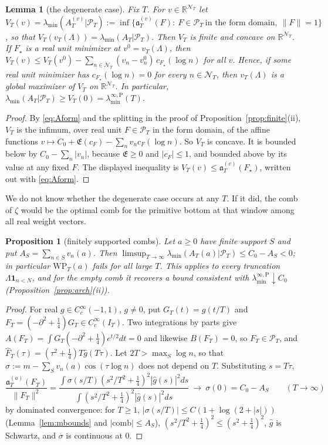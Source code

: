 \documentclass[11pt]{amsart}
\newtheorem{proposition}[theorem]{Proposition}
\newtheorem{lemma}[theorem]{Lemma}
\theoremstyle{definition}
\theoremstyle{remark}
\newcommand{\R}{\mathbb R}
\newcommand{\PT}{\mathcal P_T}
\newcommand{\IT}{I_T}
\newcommand{\lamA}{\lambda_{\min}(A_T|\PT)}
\newcommand{\Fh}{\widehat F}
\newcommand{\cF}{c_F}
\newcommand{\Lev}{\mathfrak E}
\newcommand{\NT}{\mathcal N_T}
\newcommand{\laminfP}{\lambda^{\infty,\mathrm P}_{\min}}
\begin{document}
\begin{lemma}[the degenerate case]\label{lem:degen}
Fix $T$. For $v\in\R^{\NT}$ let
$V_T(v)=\lambda_{\min}(A^{(v)}_T|\PT):=\inf\{\mathfrak a^{(v)}_T(F):\ F\in\PT\ \text{in the form domain},\ \|F\|=1\}$, so that
$V_T(v_T(\Lambda))=\lamA$. Then $V_T$ is finite and concave on $\R^{\NT}$. If $F_\star$ is a real unit
minimizer at $v^0=v_T(\Lambda)$, then
$V_T(v)\le V_T(v^0)-\sum_{n\in\NT}(v_n-v^0_n)\,c_{F_\star}(\log n)$ for all $v$. Hence, if some real unit
minimizer has $c_{F_\star}(\log n)=0$ for every $n\in\NT$, then $v_T(\Lambda)$ is a global maximizer of
$V_T$ on $\R^{\NT}$. In particular, $\lamA\ge V_T(0)=\laminfP(T)$.
\end{lemma}
\begin{proof}
By \eqref{eq:Aform} and the splitting in the proof of Proposition~\ref{prop:finite}(ii), $V_T$ is the
infimum, over real unit $F\in\PT$ in the form domain, of the affine functions
$v\mapsto C_0+\Lev(\cF)-\sum_nv_n\cF(\log n)$. So $V_T$ is concave. It is bounded below by
$C_0-\sum_n|v_n|$, because $\Lev\ge0$ and $|\cF|\le1$, and bounded above by its value at any fixed $F$.
The displayed inequality is $V_T(v)\le\mathfrak a^{(v)}_T(F_\star)$, written out with \eqref{eq:Aform}.
\end{proof}

We do not know whether the degenerate case occurs at any $T$. If it did, the comb of $\zeta$ would be
the optimal comb for the primitive bottom at that window among all real weight vectors.

\begin{proposition}[finitely supported combs]\label{prop:finsupp}
Let $a\ge0$ have finite support $S$ and put $A_S=\sum_{n\in S}v_n(a)$. Then
$\limsup_{T\to\infty}\lambda_{\min}(A_T(a)|\PT)\le C_0-A_S<0$; in particular $\mathrm{WP}_T(a)$ fails for all
large $T$. This applies to every truncation $\Lambda\mathbf 1_{n<N}$, and for the empty comb it recovers
a bound consistent with $\laminfP\downarrow C_0$ (Proposition~\ref{prop:arch}(ii)).
\end{proposition}
\begin{proof}
For real $g\in C_c^\infty(-1,1)$, $g\ne0$, put $G_T(t)=g(t/T)$ and $F_T=(-\partial^2+\frac14)G_T\in C_c^\infty(\IT)$.
Two integrations by parts give $A(F_T)=\int G_T(-\partial^2+\frac14)e^{t/2}dt=0$ and likewise $B(F_T)=0$, so
$F_T\in\PT$, and $\Fh_T(\tau)=(\tau^2+\frac14)T\widehat g(T\tau)$. Let $2T>\max_S\log n$, so that
$\sigma:=m-\sum_Sv_n(a)\cos(\tau\log n)$ does not depend on $T$. Substituting $s=T\tau$,
\[
\frac{\mathfrak a^{(a)}_T(F_T)}{\|F_T\|^2}=\frac{\int\sigma(s/T)(s^2/T^2+\frac14)^2|\widehat g(s)|^2ds}{\int(s^2/T^2+\frac14)^2|\widehat g(s)|^2ds}
\ \longrightarrow\ \sigma(0)=C_0-A_S\qquad(T\to\infty)
\]
by dominated convergence: for $T\ge1$, $|\sigma(s/T)|\le C(1+\log(2+|s|))$ (Lemma~\ref{lem:mbounds} and
$|\text{comb}|\le A_S$), $(s^2/T^2+\frac14)^2\le(s^2+\frac14)^2$, $\widehat g$ is Schwartz, and $\sigma$ is
continuous at $0$.
\end{proof}
\end{document}

